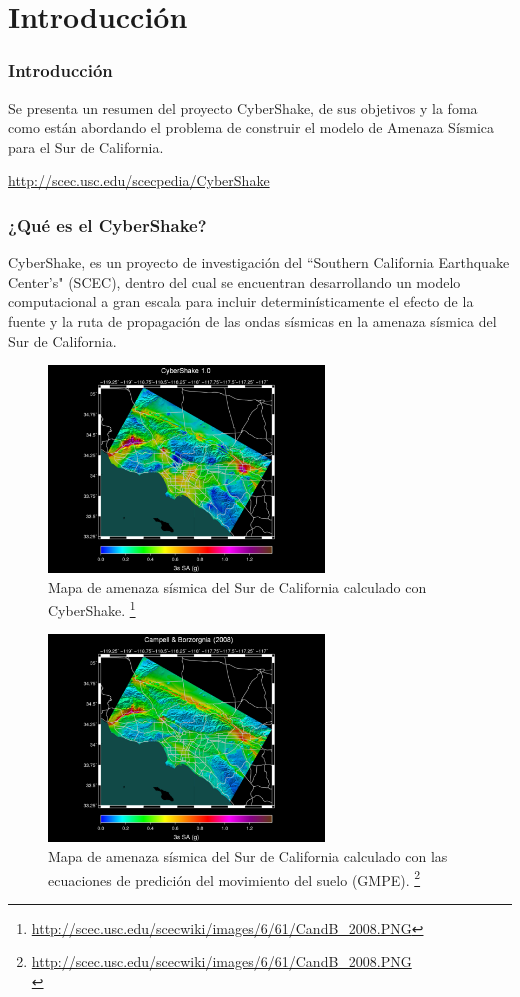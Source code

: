 \documentclass{beamer}
\begin{document}
\section{Introducción}
\begin{frame}
\frametitle{Introducción}
%
\justifying
Se presenta un resumen del proyecto {C}yber{S}hake, de sus objetivos y la foma como están abordando el problema de construir el modelo de Amenaza Sísmica para el Sur de California.

\url{http://scec.usc.edu/scecpedia/CyberShake}
%
\end{frame}
%
%
\begin{frame}[allowframebreaks]
\frametitle{¿Qué es el CyberShake?}
%
\justifying
{C}yber{S}hake, es un proyecto de investigación del ``Southern California Earthquake Center's" (SCEC), dentro del cual se encuentran desarrollando un modelo computacional a gran escala para incluir determinísticamente el efecto de la fuente y la ruta de propagación de las ondas sísmicas en la amenaza sísmica del Sur de California.\\
%
%
%
\begin{figure}[h]
	\centering
	\includegraphics[height=5.5cm]{img/CyberShake_2009.pdf}
	\caption{Mapa de amenaza sísmica del Sur de California calculado con CyberShake. \footnote{\tiny \url{http://scec.usc.edu/scecwiki/images/6/61/CandB_2008.PNG}}}
\end{figure} 
%
%
%
%
\begin{figure}[h]
	\centering
	\includegraphics[height=5.5cm]{img/CandB_2008.pdf}
	\caption{Mapa de amenaza sísmica del Sur de California calculado con las ecuaciones de predición del movimiento del suelo (GMPE). \footnote{\tiny \url{http://scec.usc.edu/scecwiki/images/6/61/CandB_2008.PNG}\\}}
	\vspace{-.5 cm}
\end{figure}
%
%
\end{frame}
\end{document}
